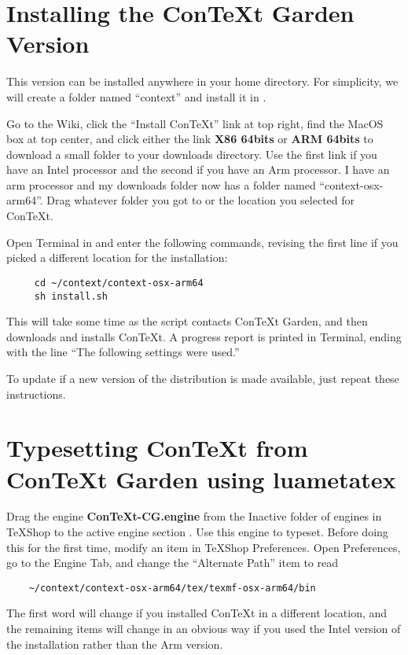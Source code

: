 \documentclass[11pt, oneside]{amsart}   	%
\begin{document}
\section{Installing the ConTeXt Garden Version}

This version can be installed anywhere in your home directory. For simplicity, we will create a folder named ``context'' and install it in
. 

Go to the Wiki, click the ``Install ConTeXt'' link at top right, find the MacOS box at top center, and click either the link {\bf X86 64bits} or {\bf ARM 64bits} to download a small folder to your downloads directory. Use the first link if you have an Intel processor and the second if you have an Arm processor. I have an arm processor and my downloads folder now has a folder named ``context-osx-arm64''. Drag whatever folder you got to  or the location you selected for ConTeXt.

Open Terminal in  and enter the following commands, revising the first line if you picked a different location for the installation:
\begin{verbatim}
     cd ~/context/context-osx-arm64
     sh install.sh
\end{verbatim}
This will take some time as the script contacts ConTeXt Garden, and then downloads and installs ConTeXt. A progress report is printed in Terminal, ending with the line ``The following settings were used.''

To update if a new version of the distribution is made available, just repeat these instructions.

\section{Typesetting ConTeXt from ConTeXt Garden using luametatex}

Drag the engine {\bf ConTeXt-CG.engine} from the Inactive folder of engines in TeXShop to the active engine section
. Use this engine to typeset. Before doing this for the first time, modify an item in TeXShop Preferences. Open Preferences, go to the Engine Tab, and change the ``Alternate Path'' item to read
\begin{verbatim}
	~/context/context-osx-arm64/tex/texmf-osx-arm64/bin
\end{verbatim}
The first word will change if you installed ConTeXt in a different location, and the remaining items will change in an obvious way if you used the Intel version of the installation rather than the Arm version.
\end{document}
